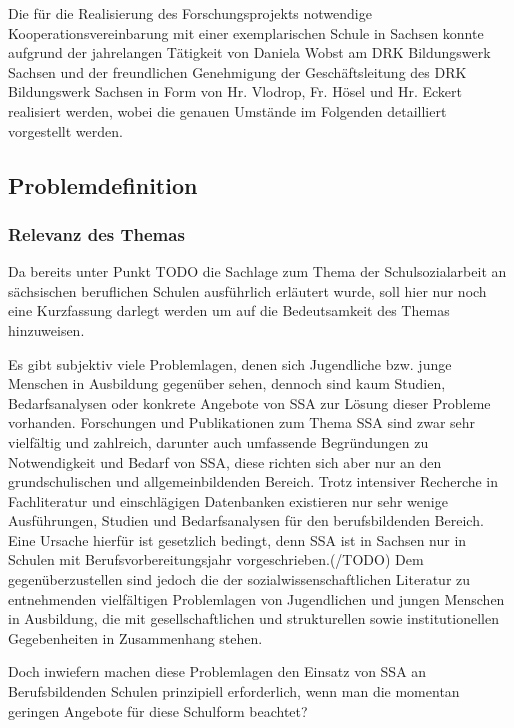 Die für die Realisierung des Forschungsprojekts notwendige Kooperationsvereinbarung mit einer exemplarischen Schule in Sachsen konnte aufgrund der jahrelangen Tätigkeit von Daniela Wobst am DRK Bildungswerk Sachsen und der freundlichen Genehmigung der Geschäftsleitung des DRK Bildungswerk Sachsen in Form von Hr. Vlodrop, Fr. Hösel und Hr. Eckert realisiert werden, wobei die genauen Umstände im Folgenden detailliert vorgestellt werden.

\subsection{Problemdefinition}
\label{sec:Problemdefinition}

\subsubsection{Relevanz des Themas}
\label{sec:RelevanzDesThemas}

Da bereits unter Punkt TODO die Sachlage zum Thema der Schulsozialarbeit an sächsischen beruflichen Schulen ausführlich erläutert wurde, soll hier nur noch eine Kurzfassung darlegt werden um auf die Bedeutsamkeit des Themas hinzuweisen.

Es gibt subjektiv viele Problemlagen, denen sich Jugendliche bzw. junge Menschen in Ausbildung gegenüber sehen, dennoch sind kaum Studien, Bedarfsanalysen oder konkrete Angebote von SSA zur Lösung dieser Probleme vorhanden. Forschungen und Publikationen zum Thema SSA sind zwar sehr vielfältig und zahlreich, darunter auch umfassende Begründungen zu Notwendigkeit und Bedarf von SSA, diese richten sich aber nur an den grundschulischen und allgemeinbildenden Bereich. Trotz intensiver Recherche in Fachliteratur und einschlägigen Datenbanken existieren nur sehr wenige Ausführungen, Studien und Bedarfsanalysen für den berufsbildenden Bereich. Eine Ursache hierfür ist gesetzlich bedingt, denn SSA ist in Sachsen nur in Schulen mit Berufsvorbereitungsjahr vorgeschrieben.(/TODO) Dem gegenüberzustellen sind jedoch die der sozialwissenschaftlichen Literatur zu entnehmenden vielfältigen Problemlagen von Jugendlichen und jungen Menschen in Ausbildung, die mit gesellschaftlichen und strukturellen sowie institutionellen Gegebenheiten in Zusammenhang stehen. 

Doch inwiefern machen diese Problemlagen den Einsatz von SSA an Berufsbildenden Schulen prinzipiell erforderlich, wenn man die momentan geringen Angebote für diese Schulform beachtet? 


